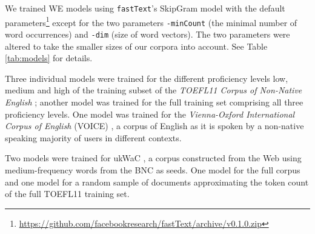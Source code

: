 \documentclass[11pt,a4paper]{article}
\newcommand\fT{\texttt{fastText}\xspace}
\begin{document}
We trained WE models using \fT's SkipGram model with the default parameters\footnote{\url{https://github.com/facebookresearch/fastText/archive/v0.1.0.zip}} except for the two parameters \texttt{-minCount} (the minimal number of word occurrences) and \texttt{-dim} (size of word vectors). 
The two parameters were altered to take the smaller sizes of our corpora into account. See Table \ref{tab:models} for details.

Three individual models were trained for the different proficiency levels low, medium and high of the training subset of the \emph{TOEFL11 Corpus of Non-Native English} \cite{ETS2:ETS202331}; another model was trained for the full training set comprising all three proficiency levels. One model was trained for the \emph{Vienna-Oxford International Corpus of English} (VOICE) \cite{Seidlhofer2013TheVOICE}, a corpus of English as it is spoken by a non-native speaking majority of users in different contexts.

Two models were trained for ukWaC \cite{wackycorpora2009}, a corpus constructed from the Web using medium-frequency words from the BNC as seeds.
One model for the full corpus and one model for a random sample of documents approximating the token count of the full TOEFL11 training set.
\end{document}
